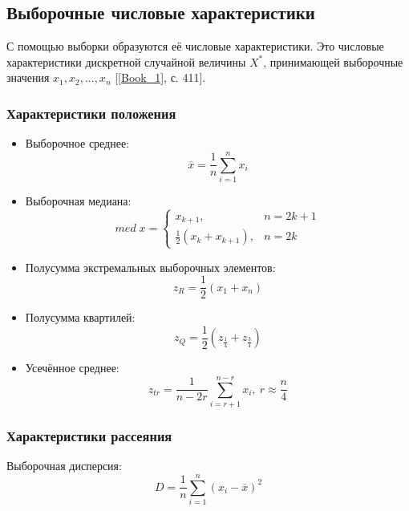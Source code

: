 \documentclass[12pt,a4paper]{article}
\begin{document}
	\subsection{Выборочные числовые характеристики}
		С помощью выборки образуются её числовые характеристики. Это числовые характеристики дискретной случайной величины $X^*$, принимающей выборочные значения $x_1, x_2, ... , x_n$ [\ref{Book_1}, с. 411].
		
	\subsubsection{Характеристики положения}
	\begin{itemize}
		\item Выборочное среднее:
		\begin{equation}\label{eqn:average}
			\overline{x} = \frac{1}{n}\sum_{i=1}^n x_i
		\end{equation}
		
		\item Выборочная медиана:
		\begin{equation}\label{eqn:med}
			med\;x =
			\begin{cases}
				x_{k+1}, & n = 2k+1\\
				\frac{1}{2}\left(x_k+x_{k+1}\right), & n = 2k
			\end{cases}
		\end{equation}
		
		\item Полусумма экстремальных выборочных элементов:
		\begin{equation}\label{eqn:mean_extr}
			z_R = \frac{1}{2}\left(x_1+x_n\right)
		\end{equation}
		
		\item Полусумма квартилей:
		\begin{equation}\label{eqn:quartiles}
			z_Q = \frac{1}{2}\left(z_{\frac{1}{4}}+z_{\frac{3}{4}}\right) 
		\end{equation}
		
		\item Усечённое среднее:
		\begin{equation}\label{eqn:trim_mean}
			z_{tr} = \frac{1}{n - 2r}\sum_{i=r+1}^{n-r} x_i,\ r\approx\frac{n}{4}
		\end{equation}
	\end{itemize}

	\subsubsection{Характеристики рассеяния}
		Выборочная дисперсия:
		\begin{equation}\label{eqn:var}
			D = \frac{1}{n}\sum_{i=1}^n (x_i-\overline{x})^2
		\end{equation}
	
\end{document}
